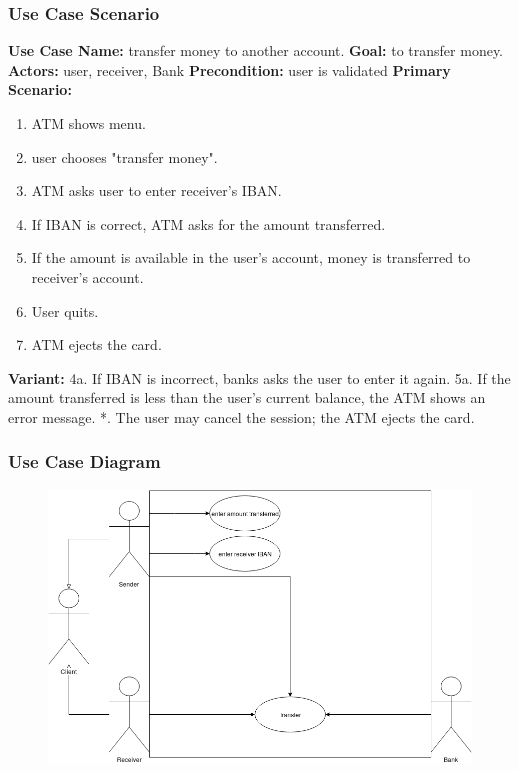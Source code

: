 \documentclass{article}
\begin{document}
		\subsubsection{Use Case Scenario}
		\textbf{Use Case Name:}	transfer money to another account.
		\newline\textbf{Goal:} to transfer money.
		\newline\textbf{Actors:} user, receiver, Bank 	
		\newline\textbf{Precondition:} user is validated 	
		\newline\textbf{Primary Scenario:}	
			\begin{enumerate}[label*=\arabic*.]
				\item ATM shows menu.
				\item user chooses "transfer money".
				\item ATM asks user to enter receiver's IBAN.
				\item If IBAN is correct, ATM asks for the amount transferred.
				\item If the amount is available in the user's account, money is transferred to receiver's account.
				\item User quits.
				\item ATM ejects the card.
			\end{enumerate}
		\textbf{Variant:}\newline	
			\hspace*{5mm}4a. If IBAN is incorrect, banks asks the user to enter it again.\newline
			\hspace*{5mm}5a. If the amount transferred is less than the user's current balance, the ATM shows an error message.\newline
			\hspace*{5mm}*. The user may cancel the session; the ATM ejects the card.

		\newpage\subsubsection{Use Case Diagram}
			\begin{figure}[h!]
			  \includegraphics[width=\linewidth]{img/transfer_usecase.png}
			\end{figure}
\end{document}
